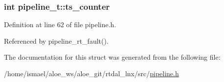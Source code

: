 \hypertarget{structpipeline__t_ada6cb4fb46dcc2966c0237c2e24db1ed}{
\subsubsection[{ts\-\_\-counter}]{\setlength{\rightskip}{0pt plus 5cm}int pipeline\-\_\-t\-::ts\-\_\-counter}}\label{structpipeline__t_ada6cb4fb46dcc2966c0237c2e24db1ed}


Definition at line 62 of file pipeline.\-h.



Referenced by pipeline\-\_\-rt\-\_\-fault().



The documentation for this struct was generated from the following file\-:\begin{DoxyCompactItemize}
\item 
/home/ismael/aloe\-\_\-ws/aloe\-\_\-git/rtdal\-\_\-lnx/src/\hyperlink{pipeline_8h}{pipeline.\-h}\end{DoxyCompactItemize}
